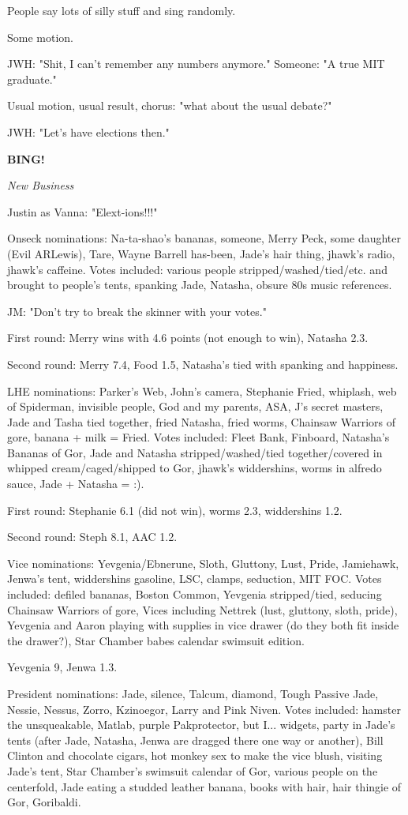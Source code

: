 \documentclass[12pt]{article}
\newcommand{\bing}{{\bf BING!} }
\newcommand{\goto}[1]{\bing \vskip 12pt \centerline{{\em{#1}}}}
\begin{document}
People say lots of silly stuff and sing randomly.

Some motion.

JWH: "Shit, I can't remember any numbers anymore." Someone: "A true MIT graduate."

Usual motion, usual result, chorus: "what about the usual debate?"

JWH: "Let's have elections then."

\goto{New Business}

Justin as Vanna: "Elext-ions!!!"

Onseck nominations: Na-ta-shao's bananas, someone, Merry Peck, some daughter (Evil ARLewis), Tare, Wayne Barrell has-been, Jade's hair thing, jhawk's radio, jhawk's caffeine. Votes included: various people stripped/washed/tied/etc. and brought to people's tents, spanking Jade, Natasha, obsure 80s music references.

JM: "Don't try to break the skinner with your votes."

First round: Merry wins with 4.6 points (not enough to win), Natasha 2.3.

Second round: Merry 7.4, Food 1.5, Natasha's tied with spanking and happiness.

LHE nominations: Parker's Web, John's camera, Stephanie Fried, whiplash, web of Spiderman, invisible people, God and my parents, ASA, J's secret masters, Jade and Tasha tied together, fried Natasha, fried worms, Chainsaw Warriors of gore, banana + milk = Fried. Votes included: Fleet Bank, Finboard, Natasha's Bananas of Gor, Jade and Natasha stripped/washed/tied together/covered in whipped cream/caged/shipped to Gor, jhawk's widdershins, worms in alfredo sauce, Jade + Natasha = :).

First round: Stephanie 6.1 (did not win), worms 2.3, widdershins 1.2.

Second round: Steph 8.1, AAC 1.2.

Vice nominations: Yevgenia/Ebnerune, Sloth, Gluttony, Lust, Pride, Jamiehawk, Jenwa's tent, widdershins gasoline, LSC, clamps, seduction, MIT FOC. Votes included: defiled bananas, Boston Common, Yevgenia stripped/tied, seducing Chainsaw Warriors of gore, Vices including Nettrek (lust, gluttony, sloth, pride), Yevgenia and Aaron playing with supplies in vice drawer (do they both fit inside the drawer?), Star Chamber babes calendar swimsuit edition.

Yevgenia 9, Jenwa 1.3.

President nominations: Jade, silence, Talcum, diamond, Tough Passive Jade, Nessie, Nessus, Zorro, Kzinoegor, Larry and Pink Niven. Votes included: hamster the unsqueakable, Matlab, purple Pakprotector, but I... widgets, party in Jade's tents (after Jade, Natasha, Jenwa are dragged there one way or another), Bill Clinton and chocolate cigars, hot monkey sex to make the vice blush, visiting Jade's tent, Star Chamber's swimsuit calendar of Gor, various people on the centerfold, Jade eating a studded leather banana, books with hair, hair thingie of Gor, Goribaldi.
\end{document}
